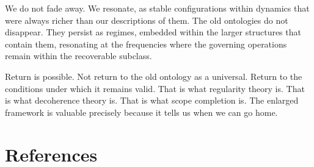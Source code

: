 \documentclass[12pt,oneside]{book}
\theoremstyle{plain}
\theoremstyle{definition}
\theoremstyle{remark}
\begin{document}
We do not fade away. We resonate, as stable configurations within dynamics
that were always richer than our descriptions of them. The old ontologies
do not disappear. They persist as regimes, embedded within the larger
structures that contain them, resonating at the frequencies where the
governing operations remain within the recoverable subclass.

Return is possible. Not return to the old ontology as a universal. Return
to the conditions under which it remains valid. That is what regularity
theory is. That is what decoherence theory is. That is what scope completion
is. The enlarged framework is valuable precisely because it tells us when
we can go home.

\backmatter

\chapter*{References}
\printbibliography[heading=none]
\end{document}
